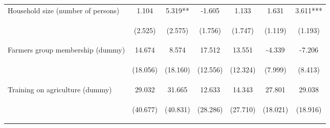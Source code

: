 \begin{center}
\begin{tabular}{lcccccc}
Household size (number of persons) & 1.104 & 5.319** & -1.605 & 1.133 & 1.631 & 3.611*** \\
\vspace{4pt} & \begin{footnotesize}(2.525)\end{footnotesize} & \begin{footnotesize}(2.575)\end{footnotesize} & \begin{footnotesize}(1.756)\end{footnotesize} & \begin{footnotesize}(1.747)\end{footnotesize} & \begin{footnotesize}(1.119)\end{footnotesize} & \begin{footnotesize}(1.193)\end{footnotesize} \\
Farmers group membership (dummy) & 14.674 & 8.574 & 17.512 & 13.551 & -4.339 & -7.206 \\
\vspace{4pt} & \begin{footnotesize}(18.056)\end{footnotesize} & \begin{footnotesize}(18.160)\end{footnotesize} & \begin{footnotesize}(12.556)\end{footnotesize} & \begin{footnotesize}(12.324)\end{footnotesize} & \begin{footnotesize}(7.999)\end{footnotesize} & \begin{footnotesize}(8.413)\end{footnotesize} \\
Training on agriculture (dummy) & 29.032 & 31.665 & 12.633 & 14.343 & 27.801 & 29.038 \\
\vspace{4pt} & \begin{footnotesize}(40.677)\end{footnotesize} & \begin{footnotesize}(40.831)\end{footnotesize} & \begin{footnotesize}(28.286)\end{footnotesize} & \begin{footnotesize}(27.710)\end{footnotesize} & \begin{footnotesize}(18.021)\end{footnotesize} & \begin{footnotesize}(18.916)\end{footnotesize} \\

\end{tabular}
\end{center}
